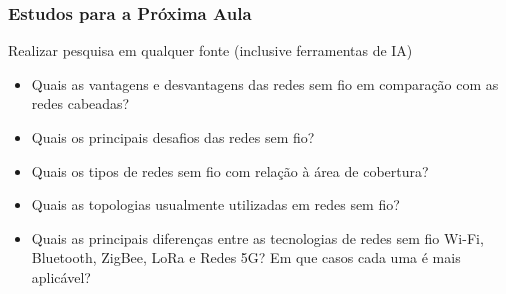 \documentclass[10pt,xcolor=table]{beamer}
\begin{document}
\begin{frame}
	\frametitle{Estudos para a Próxima Aula}
        \begin{block}{Realizar pesquisa em qualquer fonte (inclusive ferramentas de IA)}
    		\begin{itemize}
                \item Quais as vantagens e desvantagens das redes sem fio em comparação com as redes cabeadas?
                \vspace{2mm}
    			\item Quais os principais desafios das redes sem fio?
                \vspace{2mm}
                \item Quais os tipos de redes sem fio com relação à área de cobertura?
                \vspace{2mm}
                \item Quais as topologias usualmente utilizadas em redes sem fio?
                \vspace{2mm}
                \item Quais as principais diferenças entre as tecnologias de redes sem fio Wi-Fi, Bluetooth, ZigBee, LoRa e Redes 5G? Em que casos cada uma é mais aplicável?
    		\end{itemize}
    	\end{block}
\end{frame}
\end{document}
